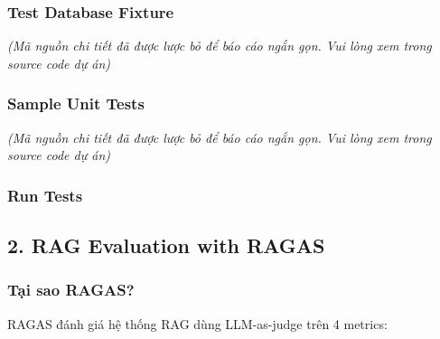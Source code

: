 \hypertarget{test-database-fixture}{%
\subsubsection{Test Database Fixture}}

\emph{(Mã nguồn chi tiết đã được lược bỏ để báo cáo ngắn gọn. Vui lòng
xem trong source code dự án)}

\hypertarget{sample-unit-tests}{%
\subsubsection{Sample Unit Tests}}

\emph{(Mã nguồn chi tiết đã được lược bỏ để báo cáo ngắn gọn. Vui lòng
xem trong source code dự án)}

\hypertarget{run-tests}{%
\subsubsection{Run Tests}}

\begin{Shaded}
\begin{Highlighting}[]
 

 

 \OperatorTok{=}\OperatorTok{=}\OperatorTok{=}\OperatorTok{=}
\end{Highlighting}
\end{Shaded}

\hypertarget{rag-evaluation-with-ragas}{%
\subsection{2. RAG Evaluation with
RAGAS}}

\hypertarget{tux1ea1i-sao-ragas}{%
\subsubsection{Tại sao RAGAS?}}

RAGAS đánh giá hệ thống RAG dùng LLM-as-judge trên 4 metrics:

